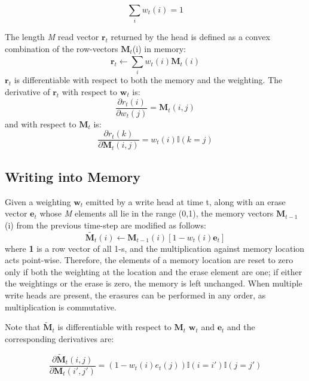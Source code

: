 \begin{equation} 
\sum_{i}^{} w_t(i)=1
\end{equation}

\noindent
The length \textit{M} read vector $\textbf{r}_t$ returned by the head is defined as a convex combination of the row-vectors $\textbf{M}_t$(i) in memory:
\begin{equation}
\textbf{r}_t \leftarrow \sum_{i}^{} w_t(i)\textbf{M}_t(i)
\end{equation}
\noindent
$\textbf{r}_t$ is differentiable with respect to both the memory and the weighting. The derivative of $\textbf{r}_t$ with respect to $\textbf{w}_t$ is:
\begin{equation}
\frac{\partial r_t(i)}{\partial w_t(j)} = \textbf{M}_t(i,j)
\end{equation}
\noindent
and with respect to $\textbf{M}_t$ is:
\begin{equation}
\frac{\partial r_t(k)}{\partial \textbf{M}_t(i,j)} = w_t(i)\mathbb{I}(k=j)
\end{equation}

\subsection{Writing into Memory}
Given a weighting $\textbf{w}_t$ emitted by a write head at time t, along with an erase vector $\textbf{e}_t$ whose \textit{M} elements all lie in the range (0,1), the memory vectors $\textbf{M}_{t-1}$(i) from the previous time-step are modified as follows: 
\begin{equation}
\widetilde{\textbf{M}_t}(i) \leftarrow \textbf{M}_{t-1}(i)[1-w_t(i)\textbf{e}_t]
\end{equation}  
\noindent
where \textbf{1} is a row vector of all 1-s, and the multiplication against memory location acts point-wise. Therefore, the elements of a memory location are reset to zero only if both the weighting at the location and the erase element are one; if either the weightings or the erase is zero, the memory is left unchanged. When multiple write heads are present, the erasures
can be performed in any order, as multiplication is commutative.

Note that $\widetilde{\textbf{M}}_t$ is differentiable with respect to $\textbf{M}_t$ $\textbf{w}_t$ and $\textbf{e}_t$ and the corresponding derivatives are:

\begin{equation}
\frac{\partial \widetilde{\textbf{M}}_t(i,j)}{\partial \textbf{M}_t(i',j')} = (1-w_t(i)e_t(j))\mathbb{I}(i=i')\mathbb{I}(j=j')
\end{equation}


